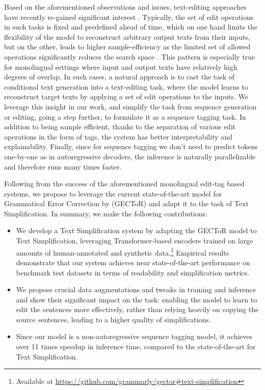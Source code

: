 \documentclass[11pt,a4paper]{article}
\begin{document}
Based on the aforementioned observations and issues, text-editing approaches have recently re-gained significant interest \cite{NIPS2019_9297, dong-etal-2019-editnts, awasthi-etal-2019-parallel,  malmi-etal-2019-encode, omelianchuk-etal-2020-gector, mallinson2020felix}. Typically, the set of edit operations in such tasks is fixed and predefined ahead of time, which on one hand limits the flexibility of the model to reconstruct arbitrary output texts from their inputs, but on the other, leads to higher sample-efficiency as the limited set of allowed operations significantly reduces the search space \cite{mallinson2020felix}. This pattern is especially true for monolingual settings where input and output texts have relatively high degrees of overlap. In such cases, a natural approach is to cast the task of conditional text generation into a text-editing task, where the model learns to reconstruct target texts by applying a set of edit operations to the inputs. We leverage this insight in our work, and simplify the task from sequence generation or editing, going a step further, to formulate it as a  sequence tagging task. In addition to being sample efficient, thanks to the separation of various edit operations in the form of tags, the system has better interpretability and explainability. Finally, since for sequence tagging we don’t need to predict tokens one-by-one as in autoregressive decoders, the inference is naturally parallelizable and therefore runs many times faster.

Following from the success of the aforementioned monolingual edit-tag based systems, we propose to leverage the current state-of-the-art model for Grammatical Error Correction by \citet{omelianchuk-etal-2020-gector} (GECToR) and adapt it to the task of Text Simplification. 
In summary, we make the following contributions:
\begin{itemize}
    \itemsep0pt
    \item We develop a Text Simplification system by adapting the GECToR model to Text Simplification, leveraging Transformer-based encoders trained on large amounts of human-annotated and synthetic data.\footnote{Available at \url{https://github.com/grammarly/gector\#text-simplification}} Empirical results demonstrate that our system achieves near state-of-the-art performance on benchmark test datasets in terms of readability and simplification metrics.
    \item We propose crucial data augmentations and tweaks in training and inference and show their significant impact on the task: enabling the model to learn to edit the sentences more effectively, rather than relying heavily on copying the source sentences, leading to a higher quality of simplifications.
    \item Since our model is a non-autoregressive sequence tagging model, it achieves over 11 times speedup in inference time, compared to the state-of-the-art for Text Simplification.
\end{itemize}
\end{document}
